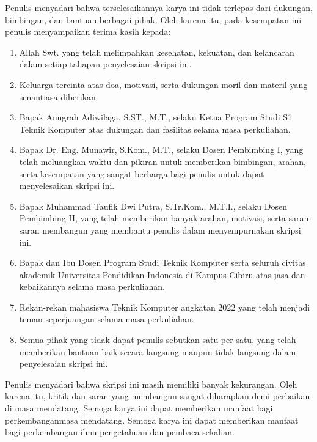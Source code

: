 \documentclass[12pt, a4paper, oneside]{report}
\newcommand{\advisorone}{Dr. Eng. Munawir, S.Kom., M.T.}
\newcommand{\advisortwo}{Muhammad Taufik Dwi Putra, S.Tr.Kom., M.T.I.}
\begin{document}
Penulis menyadari bahwa terselesaikannya karya ini tidak terlepas dari dukungan, bimbingan, dan bantuan berbagai pihak. Oleh karena itu, pada kesempatan ini penulis menyampaikan terima kasih kepada:

\begin{enumerate}[label=\arabic*., leftmargin=*, nosep]
    \item Allah Swt. yang telah melimpahkan kesehatan, kekuatan, dan kelancaran dalam setiap tahapan penyelesaian skripsi ini.
    \item Keluarga tercinta atas doa, motivasi, serta dukungan moril dan materil yang senantiasa diberikan.
    \item Bapak Anugrah Adiwilaga, S.ST., M.T., selaku Ketua Program Studi S1 Teknik Komputer atas dukungan dan fasilitas selama masa perkuliahan.
    \item Bapak \advisorone, selaku Dosen Pembimbing I, yang telah meluangkan waktu dan pikiran untuk memberikan bimbingan, arahan, serta kesempatan yang sangat berharga bagi penulis untuk dapat menyelesaikan skripsi ini.
    \item Bapak \advisortwo, selaku Dosen Pembimbing II, yang telah memberikan banyak arahan, motivasi, serta saran-saran membangun yang membantu penulis dalam menyempurnakan skripsi ini.
    \item Bapak dan Ibu Dosen Program Studi Teknik Komputer serta seluruh civitas akademik Universitas Pendidikan Indonesia di Kampus Cibiru atas jasa dan kebaikannya selama masa perkuliahan.
    \item Rekan-rekan mahasiswa Teknik Komputer angkatan 2022 yang telah menjadi teman seperjuangan selama masa perkuliahan.
    \item Semua pihak yang tidak dapat penulis sebutkan satu per satu, yang telah memberikan bantuan baik secara langsung maupun tidak langsung dalam penyelesaian skripsi ini.
\end{enumerate}

Penulis menyadari bahwa skripsi ini masih memiliki banyak kekurangan. Oleh karena itu, kritik dan saran yang membangun sangat diharapkan demi perbaikan di masa mendatang. Semoga karya ini dapat memberikan manfaat bagi perkembanganmasa mendatang. Semoga karya ini dapat memberikan manfaat bagi perkembangan ilmu pengetahuan dan pembaca sekalian.
\end{document}
